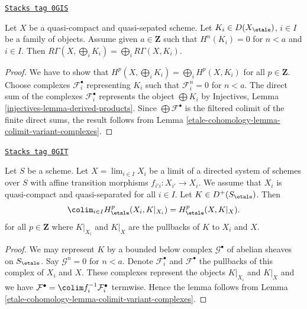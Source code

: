 \begin{lemma}
\label{etale-cohomology-lemma-direct-sum-bounded-below-cohomology}
\href{https://stacks.math.columbia.edu/tag/0GIS}{\texttt{Stacks tag 0GIS}}

Let $X$ be a quasi-compact and quasi-sepated scheme. Let
$K_i \in D(X_\etale)$, $i \in I$ be a family of objects.
Assume given $a \in \mathbf{Z}$ such that $H^n(K_i) = 0$ for $n < a$
and $i \in I$. Then $R\Gamma(X, \bigoplus_i K_i) =
\bigoplus_i R\Gamma(X, K_i)$.
\end{lemma}

\begin{proof}
We have to show that $H^p(X, \bigoplus_i K_i) =
\bigoplus_i H^p(X, K_i)$ for all $p \in \mathbf{Z}$.
Choose complexes $\mathcal{F}_i^\bullet$ representing $K_i$
such that $\mathcal{F}_i^n = 0$ for $n < a$.
The direct sum of the complexes $\mathcal{F}_i^\bullet$
represents the object $\bigoplus K_i$ by
Injectives, Lemma \ref{injectives-lemma-derived-products}.
Since $\bigoplus \mathcal{F}^\bullet$ is the filtered
colimit of the finite direct sums, the result follows
from Lemma \ref{etale-cohomology-lemma-colimit-variant-complexes}.
\end{proof}

\begin{lemma}
\label{etale-cohomology-lemma-colimit-complexes}
\href{https://stacks.math.columbia.edu/tag/0GIT}{\texttt{Stacks tag 0GIT}}

Let $S$ be a scheme. Let $X = \lim_{i \in I} X_i$ be a limit of a
directed system of schemes over $S$ with affine transition morphisms
$f_{i'i} : X_{i'} \to X_i$. We assume that $X_i$ is quasi-compact and
quasi-separated for all $i \in I$. Let $K \in D^+(S_\etale)$. Then
$$
\colim_{i \in I} H_\etale^p(X_i, K|_{X_i}) = H_\etale^p(X, K|_X).
$$
for all $p \in \mathbf{Z}$ where $K|_{X_i}$ and $K|_X$
are the pullbacks of $K$ to $X_i$ and $X$.
\end{lemma}

\begin{proof}
We may represent $K$ by a bounded below complex $\mathcal{G}^\bullet$
of abelian sheaves on $S_\etale$. Say $\mathcal{G}^n = 0$ for $n < a$.
Denote $\mathcal{F}^\bullet_i$ and $\mathcal{F}^\bullet$ the pullbacks
of this complex of $X_i$ and $X$. These complexes represent the
objects $K|_{X_i}$ and $K|_X$ and we have
$\mathcal{F}^\bullet = \colim f_i^{-1}\mathcal{F}_i^\bullet$
termwise. Hence the lemma follows from
Lemma \ref{etale-cohomology-lemma-colimit-variant-complexes}.
\end{proof}

